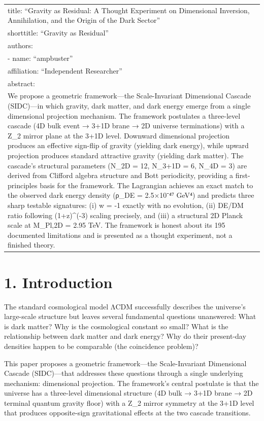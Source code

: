\begin{longtable}[]{@{}l@{}}
\toprule
\endhead
title: ``Gravity as Residual: A Thought Experiment on Dimensional
Inversion, Annihilation, and the Origin of the Dark Sector'' \\
shorttitle: ``Gravity as Residual'' \\
authors: \\
- name: ``ampbuster'' \\
affiliation: ``Independent Researcher'' \\
abstract: \textbar{} \\
We propose a geometric framework---the Scale-Invariant Dimensional
Cascade (SIDC)---in which gravity, dark matter, and dark energy emerge
from a single dimensional projection mechanism. The framework postulates
a three-level cascade (4D bulk event → 3+1D brane → 2D universe
terminations) with a Z\_2 mirror plane at the 3+1D level. Downward
dimensional projection produces an effective sign-flip of gravity
(yielding dark energy), while upward projection produces standard
attractive gravity (yielding dark matter). The cascade's structural
parameters (N\_2D = 12, N\_3+1D = 6, N\_4D = 3) are derived from
Clifford algebra structure and Bott periodicity, providing a
first-principles basis for the framework. The Lagrangian achieves an
exact match to the observed dark energy density (ρ\_DE = 2.5×10⁻⁴⁷ GeV⁴)
and predicts three sharp testable signatures: (i) w = -1 exactly with no
evolution, (ii) DE/DM ratio following (1+z)\^{}(-3) scaling precisely,
and (iii) a structural 2D Planck scale at M\_Pl,2D = 2.95 TeV. The
framework is honest about its 195 documented limitations and is
presented as a thought experiment, not a finished theory. \\
\bottomrule
\end{longtable}

\hypertarget{introduction}{%
\section{1. Introduction}\label{introduction}}

The standard cosmological model ΛCDM successfully describes the
universe's large-scale structure but leaves several fundamental
questions unanswered: What is dark matter? Why is the cosmological
constant so small? What is the relationship between dark matter and dark
energy? Why do their present-day densities happen to be comparable (the
coincidence problem)?

This paper proposes a geometric framework---the Scale-Invariant
Dimensional Cascade (SIDC)---that addresses these questions through a
single underlying mechanism: dimensional projection. The framework's
central postulate is that the universe has a three-level dimensional
structure (4D bulk → 3+1D brane → 2D terminal quantum gravity floor)
with a Z\_2 mirror symmetry at the 3+1D level that produces
opposite-sign gravitational effects at the two cascade transitions.

